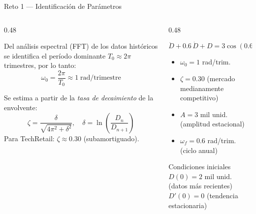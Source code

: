 \documentclass[10pt,aspectratio=169]{beamer}
\begin{document}
\begin{frame}{Reto 1 — Identificación de Parámetros}
  \begin{columns}[T]
    \begin{column}{0.48\textwidth}
      \begin{tcolorbox}[modelbox={Frecuencia natural $\omega_0$}]
        \small
        Del análisis espectral (FFT) de los datos históricos se
        identifica el período dominante $T_0 \approx 2\pi$ trimestres,
        por lo tanto:
        \[
          \omega_0 = \frac{2\pi}{T_0} \approx 1 \;\text{rad/trimestre}
        \]
      \end{tcolorbox}
      \vspace{6pt}
      \begin{tcolorbox}[modelbox={Coeficiente $\zeta$}]
        \small
        Se estima a partir de la \emph{tasa de decaimiento} de la envolvente:
        \[
          \zeta = \frac{\delta}{\sqrt{4\pi^2 + \delta^2}}, \quad
          \delta = \ln\!\left(\frac{D_n}{D_{n+1}}\right)
        \]
        Para TechRetail: $\zeta \approx 0.30$ (subamortiguado).
      \end{tcolorbox}
    \end{column}
    \begin{column}{0.48\textwidth}
      \begin{tcolorbox}[resultbox={Modelo identificado}]
        \[
          \boxed{
            \ddot{D} + 0{.}6\,\dot{D} + D = 3\cos(0{.}6\,t)
          }
        \]
        \vspace{2pt}
        \small
        \begin{itemize}
          \item $\omega_0 = 1$ rad/trim.
          \item $\zeta = 0.30$ (mercado medianamente competitivo)
          \item $A = 3$ mil unid. (amplitud estacional)
          \item $\omega_f = 0.6$ rad/trim. (ciclo anual)
        \end{itemize}
      \end{tcolorbox}
      \vspace{4pt}
      \begin{alertblock}{Condiciones iniciales}
        \small
        $D(0) = 2$ mil unid. \; (datos más recientes)\\
        $D'(0) = 0$ \; (tendencia estacionaria)
      \end{alertblock}
    \end{column}
  \end{columns}
\end{frame}
\end{document}
